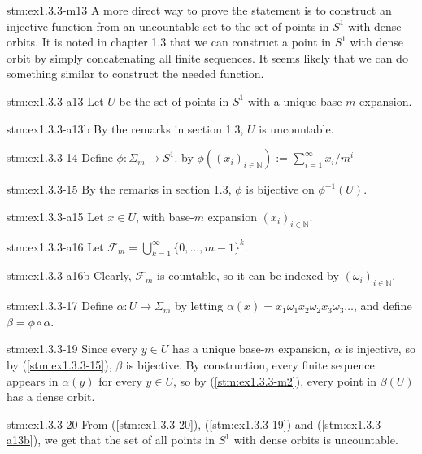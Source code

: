 \begin{explanation}{stm:ex1.3.3-m13}
A more direct way to prove the statement is to construct an injective function from an uncountable set to the set of points in $S^1$ with dense orbits. It is noted in chapter 1.3 that we can construct a point in $S^1$ with dense orbit by simply concatenating all finite sequences. It seems likely that we can do something similar to construct the needed function.
\end{explanation}

\begin{statement}{stm:ex1.3.3-a13}
Let $U$ be the set of points in $S^1$ with a unique base-$m$ expansion. 
\end{statement}

\begin{statement}{stm:ex1.3.3-a13b}
By the remarks in section 1.3, $U$ is uncountable.
\end{statement}

\begin{statement}{stm:ex1.3.3-14}
Define $\phi : \Sigma_m \to S^1$. by $\phi((x_i)_{i \in \mathbb{N}}) := \sum_{i=1}^\infty x_i / m^i$
\end{statement}

\begin{statement}{stm:ex1.3.3-15}
By the remarks in section 1.3, $\phi$ is bijective on $\phi^{-1}(U)$.
\end{statement}{}

\begin{statement}{stm:ex1.3.3-a15}
Let $x \in U$, with base-$m$ expansion $(x_i)_{i \in \mathbb{N}}$.
\end{statement}

\begin{statement}{stm:ex1.3.3-a16}
Let $\mathcal{F}_m = \bigcup_{k=1}^\infty \{0, \dots, m-1\}^k$.
\end{statement}

\begin{statement}{stm:ex1.3.3-a16b}
Clearly, $\mathcal{F}_m$ is countable, so it can be indexed by $(\omega_i)_{i \in \mathbb{N}}$.
\end{statement}

\begin{statement}{stm:ex1.3.3-17}
Define $\alpha : U \to \Sigma_m$ by letting $\alpha(x) = x_1 \omega_1 x_2 \omega_2 x_3 \omega_3 \dots$, and define $\beta = \phi \circ \alpha$.
\end{statement}

\begin{statement}{stm:ex1.3.3-19}
Since every $y \in U$ has a unique base-$m$ expansion, $\alpha$ is injective, so by (\ref{stm:ex1.3.3-15}), $\beta$ is bijective. By construction, every finite sequence appears in $\alpha(y)$ for every $y \in U$, so by (\ref{stm:ex1.3.3-m2}), every point in $\beta(U)$ has a dense orbit.
\end{statement}

\begin{statement}{stm:ex1.3.3-20}
From (\ref{stm:ex1.3.3-20}), (\ref{stm:ex1.3.3-19}) and (\ref{stm:ex1.3.3-a13b}), we get that the set of all points in $S^1$ with dense orbits is uncountable.
\end{statement}

